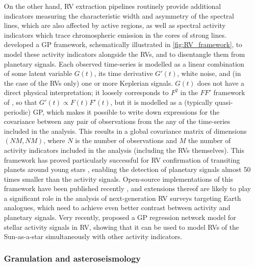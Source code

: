 \documentclass[letterpaper]{ar-1col}
\begin{document}
On the other hand, RV extraction pipelines routinely provide additional indicators measuring the characteristic width and asymmetry of the spectral lines, which are also affected by active regions, as well as spectral activity indicators which trace chromospheric emission in the cores of strong lines. \citet{2015MNRAS.452.2269R} developed a GP framework, schematically illustrated in \autoref{fig:RV_framework}, to model these activity indicators alongside the RVs, and to disentangle them from planetary signals. Each observed time-series is modelled as a linear combination of some latent variable $G(t)$, its time derivative $G'(t)$, white noise, and (in the case of the RVs only) one or more Keplerian signals. $G(t)$ does not have a direct physical interpretation; it loosely corresponds to $F^2$ in the $FF'$ framework of \citet{2012MNRAS.419.3147A}, so that $G'(t) \propto F(t) F'(t)$, but it is modelled as a (typically quasi-periodic) GP, which makes it possible to write down expressions for the covariance between any pair of observations from the any of the time-series included in the analysis. This results in a global covariance matrix of dimensions $(NM,NM)$, where $N$ is the number of observations and $M$ the number of activity indicators included in the analysis (including the RVs themselves). This framework has proved particularly successful for RV confirmation of transiting planets around young stars \citep{2019MNRAS.490..698B,2022MNRAS.512.3060Z}, enabling the detection of planetary signals almost 50 times smaller than the activity signals.  Open-source implementations of this framework have been published recently \citep{2022MNRAS.509..866B,2022A&A...659A.182D}, and extensions thereof are likely to play a significant role in the analysis of next-generation RV surveys targeting Earth analogues, which need to achieve even better contrast between activity and planetary signals. Very recently,  \citet{2022arXiv220506627C} proposed a GP regression network model for stellar activity signals in RV, showing that it can be used to model RVs of the Sun-as-a-star simultaneously with other activity indicators.

\subsubsection{Granulation and asteroseismology}
\end{document}
